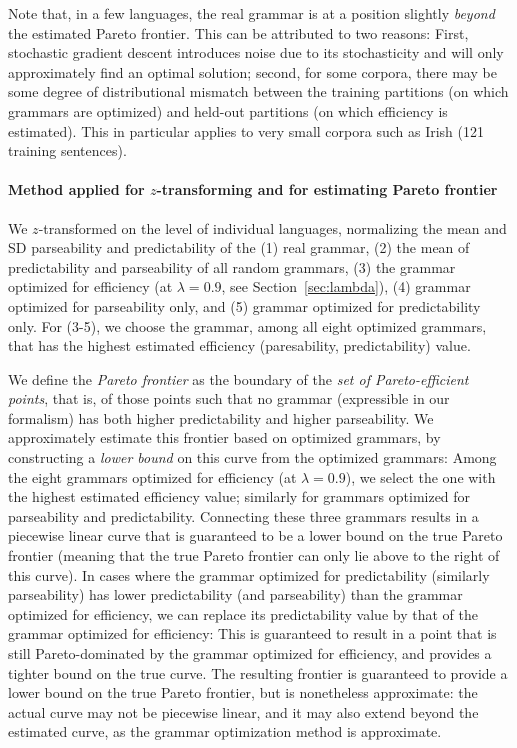 \documentclass[10pt,twoside,lineno]{article}
\begin{document}
Note that, in a few languages, the real grammar is at a position slightly \emph{beyond} the estimated Pareto frontier. This can be attributed to two reasons: First, stochastic gradient descent introduces noise due to its stochasticity and will only approximately find an optimal solution; second, for some corpora, there may be some degree of distributional mismatch between the training partitions (on which grammars are optimized) and held-out partitions (on which efficiency is estimated). This in particular applies to very small corpora such as Irish (121 training sentences).

\paragraph{Method applied for $z$-transforming and for estimating Pareto frontier}
We $z$-transformed on the level of individual languages, normalizing the mean and SD parseability and predictability of the (1) real grammar, (2) the mean of predictability and parseability of all random grammars, (3) the grammar optimized for efficiency (at $\lambda =0.9$, see Section~\ref{sec:lambda}), (4) grammar optimized for parseability only, and (5) grammar optimized for predictability only.
For (3-5), we choose the grammar, among all eight optimized grammars, that has the highest estimated efficiency (paresability, predictability) value.

We define the \emph{Pareto frontier} as the boundary of the \emph{set of Pareto-efficient points}, that is, of those points such that no grammar (expressible in our formalism) has both higher predictability and higher parseability.
We approximately estimate this frontier based on optimized grammars, by constructing a \emph{lower bound} on this curve from the optimized grammars:
Among the eight grammars optimized for efficiency (at $\lambda=0.9$), we select the one with the highest estimated efficiency value; similarly for grammars optimized for parseability and predictability.
Connecting these three grammars results in a piecewise linear curve that is guaranteed to be a lower bound on the true Pareto frontier (meaning that the true Pareto frontier can only lie above to the right of this curve).
In cases where the grammar optimized for predictability (similarly parseability) has lower predictability (and parseability) than the grammar optimized for efficiency, we can replace its predictability value by that of the grammar optimized for efficiency: This is guaranteed to result in a point that is still Pareto-dominated by the grammar optimized for efficiency, and provides a tighter bound on the true curve.
The resulting frontier is guaranteed to provide a lower bound on the true Pareto frontier, but is nonetheless approximate: the actual curve may not be piecewise linear, and it may also extend beyond the estimated curve, as the grammar optimization method is approximate.
\end{document}

